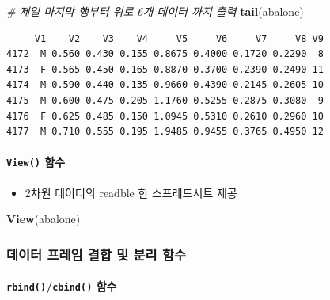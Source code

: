 \documentclass[
  11pt,
]{krantz}
\newenvironment{Shaded}{\begin{snugshade}}{\end{snugshade}}
\newcommand{\CommentTok}[1]{\textcolor[rgb]{0.37,0.37,0.37}{\textit{#1}}}
\newcommand{\KeywordTok}[1]{\textcolor[rgb]{0.27,0.27,0.27}{\textbf{#1}}}
\newcommand{\NormalTok}[1]{#1}
\providecommand{\tightlist}{%
  \setlength{\itemsep}{0pt}\setlength{\parskip}{0pt}}
\begin{document}
\begin{Shaded}
\begin{Highlighting}[]
\CommentTok{# 제일 마지막 행부터 위로 6개 데이터 까지 출력}
\KeywordTok{tail}\NormalTok{(abalone)}
\end{Highlighting}
\end{Shaded}

\begin{verbatim}
     V1    V2    V3    V4     V5     V6     V7     V8 V9
4172  M 0.560 0.430 0.155 0.8675 0.4000 0.1720 0.2290  8
4173  F 0.565 0.450 0.165 0.8870 0.3700 0.2390 0.2490 11
4174  M 0.590 0.440 0.135 0.9660 0.4390 0.2145 0.2605 10
4175  M 0.600 0.475 0.205 1.1760 0.5255 0.2875 0.3080  9
4176  F 0.625 0.485 0.150 1.0945 0.5310 0.2610 0.2960 10
4177  M 0.710 0.555 0.195 1.9485 0.9455 0.3765 0.4950 12
\end{verbatim}

\normalsize

\hypertarget{view-fun}{%
\paragraph{\texorpdfstring{\texttt{View()} 함수}{View() 함수}}\label{view-fun}}

\begin{itemize}
\tightlist
\item
  2차원 데이터의 readble 한 스프레드시트 제공
\end{itemize}

\footnotesize

\begin{Shaded}
\begin{Highlighting}[]
\KeywordTok{View}\NormalTok{(abalone)}
\end{Highlighting}
\end{Shaded}

\normalsize

\hypertarget{df-merge-split}{%
\subsubsection*{데이터 프레임 결합 및 분리 함수}\label{df-merge-split}}


\hypertarget{rbind-cbind}{%
\paragraph{\texorpdfstring{\texttt{rbind()}/\texttt{cbind()} 함수}{rbind()/cbind() 함수}}\label{rbind-cbind}}
\end{document}
